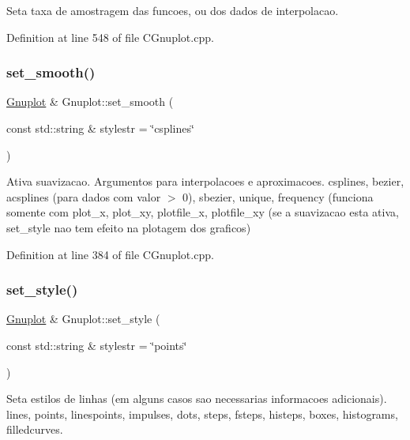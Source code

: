 Seta taxa de amostragem das funcoes, ou dos dados de interpolacao. 



Definition at line 548 of file C\+Gnuplot.\+cpp.

\mbox{\label{class_gnuplot_aa18386919da2ec4c994f1f9c7195d384}} 
\subsubsection{\texorpdfstring{set\+\_\+smooth()}{set\_smooth()}}
{\footnotesize\ttfamily \hyperlink{class_gnuplot}{Gnuplot} \& Gnuplot\+::set\+\_\+smooth (\begin{DoxyParamCaption}\item[{const std\+::string \&}]{stylestr = {\ttfamily \char`\"{}csplines\char`\"{}} }\end{DoxyParamCaption})}



Ativa suavizacao. Argumentos para interpolacoes e aproximacoes. csplines, bezier, acsplines (para dados com valor $>$ 0), sbezier, unique, frequency (funciona somente com plot\+\_\+x, plot\+\_\+xy, plotfile\+\_\+x, plotfile\+\_\+xy (se a suavizacao esta ativa, set\+\_\+style nao tem efeito na plotagem dos graficos) 



Definition at line 384 of file C\+Gnuplot.\+cpp.

\mbox{\label{class_gnuplot_acfdcda292650775ebed4683e8e1515b5}} 
\subsubsection{\texorpdfstring{set\+\_\+style()}{set\_style()}}
{\footnotesize\ttfamily \hyperlink{class_gnuplot}{Gnuplot} \& Gnuplot\+::set\+\_\+style (\begin{DoxyParamCaption}\item[{const std\+::string \&}]{stylestr = {\ttfamily \char`\"{}points\char`\"{}} }\end{DoxyParamCaption})}



Seta estilos de linhas (em alguns casos sao necessarias informacoes adicionais). lines, points, linespoints, impulses, dots, steps, fsteps, histeps, boxes, histograms, filledcurves. 



